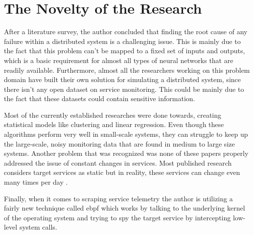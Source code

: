 \section{The Novelty of the Research}

After a literature survey, the author concluded that finding the root cause of any failure within a distributed system is a challenging issue. This is mainly due to the fact that this problem can't be mapped to a fixed set of inputs and outputs, which is a basic requirement for almost all types of neural networks that are readily available. Furthermore, almost all the researchers working on this problem domain have built their own solution for simulating a distributed system, since there isn't any open dataset on service monitoring. This could be mainly due to the fact that these datasets could contain sensitive information. 

Most of the currently established researches were done towards, creating statistical models like clustering and linear regression. Even though these algorithms perform very well in small-scale systems, they can struggle to keep up the large-scale, noisy monitoring data that are found in medium to large size systems. Another problem that was recognized was none of these papers properly addressed the issue of constant changes in services. Most published research considers target services as static but in reality, these services can change even many times per day \citep{GoingtoM51:online}.

Finally, when it comes to scraping service telemetry the author is utilizing a fairly new technique called \ac{ebpf} which works by talking to the underlying kernel of the operating system and trying to spy the target service by intercepting low-level system calls.